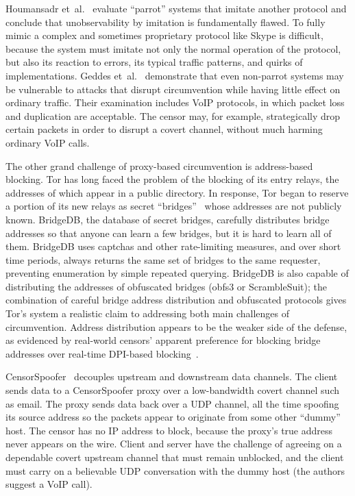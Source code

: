 \documentclass[conference]{IEEEtran}
\begin{document}
Houmansadr et~al.~\cite{parrot} evaluate ``parrot'' systems that imitate another protocol
and conclude that unobservability by imitation is fundamentally flawed.
To fully mimic a complex and sometimes proprietary protocol like Skype
is difficult,
because the system must imitate not only the normal operation of the protocol,
but also its reaction to errors,
its typical traffic patterns, and quirks of implementations.
Geddes et~al.~\cite{acks}
demonstrate that even non-parrot systems may be vulnerable to
attacks that disrupt circumvention while having little effect
on ordinary traffic.
Their examination includes VoIP protocols,
in which packet loss and duplication are acceptable.
The censor may, for example, strategically drop certain packets
in order to disrupt a covert channel, without much harming ordinary VoIP calls.


The other grand challenge of proxy-based circumvention is address-based blocking.
Tor has long faced the problem of the blocking of its entry relays,
the addresses of which appear in a public directory.
In response, Tor began to reserve a portion of its
new relays as secret ``bridges''~\cite{tor-blocking}
whose addresses are not publicly known.
BridgeDB, the database of secret bridges,
carefully distributes bridge addresses
so that anyone can learn a few bridges, but it is hard to learn all of them.
BridgeDB uses captchas and other rate-limiting measures,
and over short time periods,
always returns the same set of bridges to the same requester,
preventing enumeration by simple repeated querying.
BridgeDB is also capable of distributing the addresses
of obfuscated bridges (obfs3 or ScrambleSuit);
the combination
of careful bridge address distribution and obfuscated protocols
gives Tor's system a realistic claim to addressing both main challenges of circumvention.
Address distribution appears to be the weaker side of the defense,
as evidenced by real-world censors' apparent preference for
blocking bridge addresses over real-time DPI-based blocking~\cite{foci12-winter}.

CensorSpoofer~\cite{censorspoofer}
decouples upstream and downstream data channels.
The client sends data to a CensorSpoofer proxy over a low-bandwidth covert channel such as email.
The proxy sends data back over a UDP channel, all the time
spoofing its source address so the packets appear to originate from some other ``dummy'' host.
The censor has no IP address to block, because the proxy's true address never appears on the wire.
Client and server have the challenge of agreeing on a dependable covert upstream channel
that must remain unblocked,
and the client must carry on a believable UDP conversation with the dummy host
(the authors suggest a VoIP call).
\end{document}
